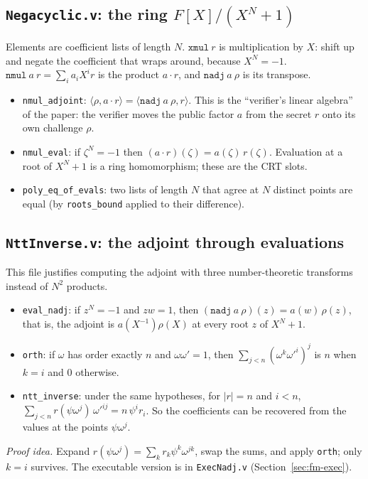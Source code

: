 \documentclass[11pt,a4paper]{article}
\newcommand{\ip}[2]{\langle #1, #2\rangle}
\theoremstyle{definition}
\theoremstyle{plain}
\begin{document}
\subsection{\texttt{Negacyclic.v}: the ring $F[X]/(X^N+1)$}

Elements are coefficient lists of length $N$. $\mathtt{xmul}\ r$ is multiplication by $X$: shift up
and negate the coefficient that wraps around, because $X^N=-1$. $\mathtt{nmul}\ a\ r=\sum_ia_iX^ir$
is the product $a\cdot r$, and $\mathtt{nadj}\ a\ \rho$ is its transpose.
\begin{itemize}[leftmargin=1.3em]
\item \texttt{nmul\_adjoint}: $\ip{\rho}{a\cdot r}=\ip{\mathtt{nadj}\ a\ \rho}{r}$. This is the
  ``verifier's linear algebra'' of the paper: the verifier moves the public factor $a$ from the
  secret $r$ onto its own challenge $\rho$.
\item \texttt{nmul\_eval}: if $\zeta^N=-1$ then $(a\cdot r)(\zeta)=a(\zeta)\,r(\zeta)$. Evaluation at a
  root of $X^N+1$ is a ring homomorphism; these are the CRT slots.
\item \texttt{poly\_eq\_of\_evals}: two lists of length $N$ that agree at $N$ distinct points are
  equal (by \texttt{roots\_bound} applied to their difference).
\end{itemize}

\subsection{\texttt{NttInverse.v}: the adjoint through evaluations}

This file justifies computing the adjoint with three number-theoretic transforms instead of $N^2$
products.
\begin{itemize}[leftmargin=1.3em]
\item \texttt{eval\_nadj}: if $z^N=-1$ and $zw=1$, then $(\mathtt{nadj}\ a\ \rho)(z)=a(w)\,\rho(z)$, that
  is, the adjoint is $a(X^{-1})\rho(X)$ at every root $z$ of $X^N+1$.
\item \texttt{orth}: if $\omega$ has order exactly $n$ and $\omega\omega'=1$, then
  $\sum_{j<n}(\omega^k\omega'^i)^j$ is $n$ when $k=i$ and $0$ otherwise.
\item \texttt{ntt\_inverse}: under the same hypotheses, for $|r|=n$ and $i<n$,
  $\sum_{j<n}r(\psi\omega^j)\,\omega'^{ij}=n\,\psi^i r_i$. So the coefficients can be recovered from
  the values at the points $\psi\omega^j$.
\end{itemize}
\emph{Proof idea.} Expand $r(\psi\omega^j)=\sum_kr_k\psi^k\omega^{jk}$, swap the sums, and apply
\texttt{orth}; only $k=i$ survives. The executable version is in \texttt{ExecNadj.v}
(Section~\ref{sec:fm-exec}).
\end{document}
